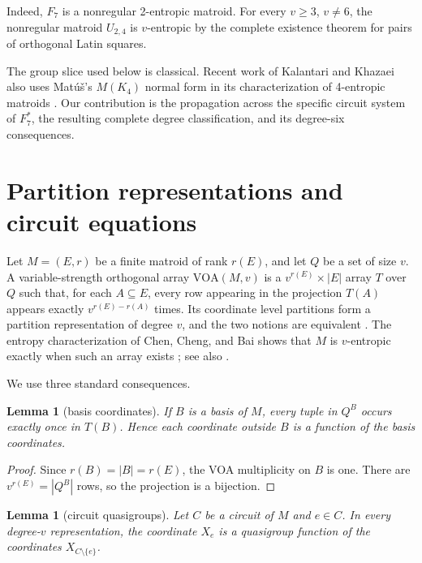 \documentclass[11pt]{article}
\newtheorem{lemma}[theorem]{Lemma}
\numberwithin{equation}{section}
\begin{document}
Indeed, $F_7$ is a nonregular 2-entropic matroid. For every
$v\ge 3$, $v\ne 6$, the nonregular matroid $U_{2,4}$ is
$v$-entropic by the complete existence theorem for pairs of orthogonal
Latin squares.

The group slice used below is classical. Recent work of Kalantari and
Khazaei also uses Mat\'u\v{s}'s $M(K_4)$ normal form in its characterization of
4-entropic matroids \cite{kalantari2026}. Our contribution is the propagation across the
specific circuit system of $F_7^*$, the resulting complete degree
classification, and its degree-six consequences.

\section{Partition representations and circuit equations}


Let $M=(E,r)$ be a finite matroid of rank $r(E)$, and let $Q$ be a set
of size $v$. A variable-strength orthogonal array
$\mathrm{VOA}(M,v)$ is a $v^{r(E)}\times |E|$ array $T$ over
$Q$ such that, for each $A\subseteq E$, every row appearing in the
projection $T(A)$ appears exactly $v^{r(E)-r(A)}$ times. Its coordinate
level partitions form a partition representation of degree $v$, and the
two notions are equivalent \cite{matus1999,chen2025}. The entropy characterization of Chen,
Cheng, and Bai shows that $M$ is $v$-entropic exactly when such an array
exists \cite[Theorem 1 and the discussion following it]{chen2025}; see also \cite[Proposition 2.3]{kalantari2026}.

We use three standard consequences.

\Needspace{0.26\textheight}
\begin{lemma}[basis coordinates]
If $B$ is a basis of $M$, every tuple
in $Q^B$ occurs exactly once in $T(B)$. Hence each coordinate outside
$B$ is a function of the basis coordinates.

\end{lemma}

\begin{proof}
Since $r(B)=|B|=r(E)$, the VOA multiplicity on $B$ is one.
There are $v^{r(E)}=|Q^B|$ rows, so the projection is a bijection.
\end{proof}


\Needspace{0.26\textheight}
\begin{lemma}[circuit quasigroups]
Let $C$ be a circuit of $M$ and
$e\in C$. In every degree-$v$ representation, the coordinate $X_e$
is a quasigroup function of the coordinates $X_{C\setminus\{e\}}$.

\end{lemma}
\end{document}
